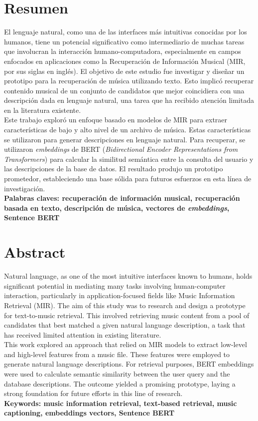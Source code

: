 \chapter*{Resumen} 
El lenguaje natural, como una de las interfaces más intuitivas conocidas por los humanos, tiene un potencial significativo 
como intermediario de muchas tareas que involucran la interacción humano-computadora, especialmente en campos enfocados en 
aplicaciones como la Recuperación de Información Musical (MIR, por sus siglas en inglés). El objetivo de este estudio fue 
investigar y diseñar un prototipo para la recuperación de música utilizando texto. Esto implicó recuperar contenido musical 
de un conjunto de candidatos que mejor coincidiera con una descripción dada en lenguaje natural, una tarea que ha recibido atención 
limitada en la literatura existente.\\
Este trabajo exploró un enfoque basado en modelos de MIR para extraer características de bajo y alto nivel de un archivo de música. 
Estas características se utilizaron para generar descripciones en lenguaje natural. Para recuperar, se utilizaron \textit{embeddings} de BERT 
(\textit{Bidirectional Encoder Representations from Transformers}) para calcular la similitud semántica entre la consulta del usuario 
y las descripciones de la base de datos. El resultado produjo un prototipo prometedor, estableciendo una base sólida para futuros esfuerzos 
en esta línea de investigación.\\

{\bf Palabras claves: recuperación de información musical, recuperación basada en texto, descripción de música, vectores de \textit{embeddings}, Sentence BERT} 

\chapter*{Abstract}
Natural language, as one of the most intuitive interfaces known to humans, holds significant potential in mediating many 
tasks involving human-computer interaction, particularly in application-focused fields like Music Information Retrieval 
(MIR). The aim of this study was to research and design a prototype for text-to-music retrieval. This involved retrieving 
music content from a pool of candidates that best matched a given natural language description, a task that has received 
limited attention in existing literature. \\
This work explored an approach that relied on MIR models to extract low-level and high-level features from a music file. 
These features were employed to generate natural language descriptions. For retrieval purposes, BERT embeddings were 
used to calculate semantic similarity between the user query and the database descriptions. The outcome yielded a promising 
prototype, laying a strong foundation for future efforts in this line of research.\\

{\bf Keywords: music information retrieval, text-based retrieval, music captioning, embeddings vectors, Sentence BERT} 